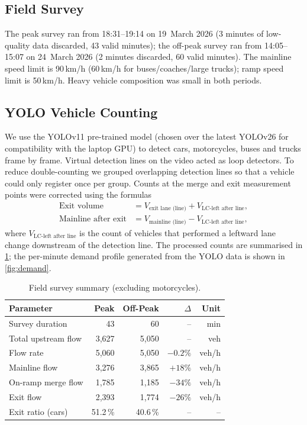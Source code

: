 \documentclass[11pt,a4paper]{article}
\begin{document}
\subsection{Field Survey}
The peak survey ran from 18:31--19:14 on 19~March 2026 (3 minutes of low-quality data discarded, 43 valid minutes); the off-peak survey ran from 14:05--15:07 on 24~March 2026 (2 minutes discarded, 60 valid minutes). The mainline speed limit is 90\,km/h (60\,km/h for buses/coaches/large trucks); ramp speed limit is 50\,km/h. Heavy vehicle composition was small in both periods.

\subsection{YOLO Vehicle Counting}
\label{sec:yolo}
We use the YOLOv11 pre-trained model (chosen over the latest YOLOv26 for compatibility with the laptop GPU) to detect cars, motorcycles, buses and trucks frame by frame. Virtual detection lines on the video acted as loop detectors. To reduce double-counting we grouped overlapping detection lines so that a vehicle could only register once per group. Counts at the merge and exit measurement points were corrected using the formulas
\begin{align}
\text{Exit volume} &= V_{\text{exit lane (line)}} + V_{\text{LC-left after line}}, \label{eq:yolo1} \\
\text{Mainline after exit} &= V_{\text{mainline (line)}} - V_{\text{LC-left after line}}, \label{eq:yolo2}
\end{align}
where $V_{\text{LC-left after line}}$ is the count of vehicles that performed a leftward lane change downstream of the detection line. The processed counts are summarised in \cref{tab:survey}; the per-minute demand profile generated from the YOLO data is shown in \cref{fig:demand}.

\begin{table}[H]
\centering
\caption{Field survey summary (excluding motorcycles).}
\label{tab:survey}
\begin{tabular}{lrrrr}
\toprule
\textbf{Parameter} & \textbf{Peak} & \textbf{Off-Peak} & \textbf{$\Delta$} & \textbf{Unit} \\ \midrule
Survey duration            & 43    & 60    & --     & min \\
Total upstream flow        & 3{,}627 & 5{,}050 & --   & veh \\
Flow rate                  & 5{,}060 & 5{,}050 & $-0.2\%$ & veh/h \\
Mainline flow              & 3{,}276 & 3{,}865 & $+18\%$  & veh/h \\
On-ramp merge flow         & 1{,}785 & 1{,}185 & $-34\%$  & veh/h \\
Exit flow                  & 2{,}393 & 1{,}774 & $-26\%$  & veh/h \\
Exit ratio (cars)          & 51.2\,\% & 40.6\,\% & --   & -- \\
\bottomrule
\end{tabular}
\end{table}
\end{document}
